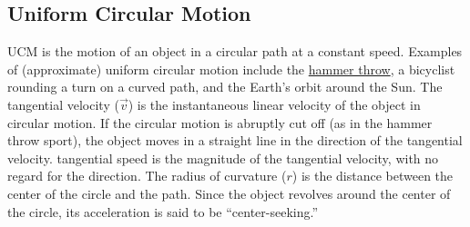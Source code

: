 \documentclass[main.tex]{subfiles}
\begin{document}
\subsection{Uniform Circular Motion} \label{uPOucv}

\Gls{UCM} is the motion of an object in a circular path at a constant speed. Examples of (approximate) uniform circular motion include the \href{https://youtu.be/3NYlYN-QTig}{hammer throw}, a bicyclist rounding a turn on a curved path, and the Earth's orbit around the Sun. The \gls{tangential velocity} ($\vec{v}$) is the instantaneous linear velocity of the object in circular motion. If the circular motion is abruptly cut off (as in the hammer throw sport), the object moves in a straight line in the direction of the tangential velocity. \Gls{tangential speed} is the magnitude of the tangential velocity, with no regard for the direction. The \gls{radius of curvature} ($r$) is the distance between the center of the circle and the path. Since the object revolves around the center of the circle, its acceleration is said to be ``center-seeking.''

\begin{center}
\centering
{}
\end{center}
\end{document}
